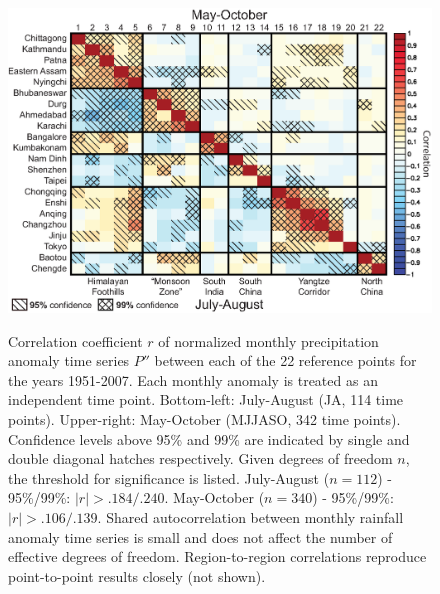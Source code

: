\begin{figure}[t]
\centering
  \noindent\includegraphics[width=36pc,angle=0]{Figures/ch2/fig3correl}\\
  \caption{Correlation coefficient $r$ of normalized monthly precipitation anomaly time series $P''$ between each of the 22 reference points for the years 1951-2007. Each monthly anomaly is treated as an independent time point. Bottom-left: July-August (JA, 114 time points). Upper-right: May-October (MJJASO, 342 time points). Confidence levels above 95\% and 99\% are indicated by single and double diagonal hatches respectively. Given degrees of freedom $n$, the threshold for significance is listed. July-August ($n=112$) - 95\%/99\%: $\lvert r\rvert >.184/.240$. May-October ($n=340$) - 95\%/99\%: $\lvert r\rvert>.106/.139$. Shared autocorrelation between monthly rainfall anomaly time series is small and does not affect the number of effective degrees of freedom. Region-to-region correlations reproduce point-to-point results closely (not shown).}
\label{fig:f23}
\end{figure}


